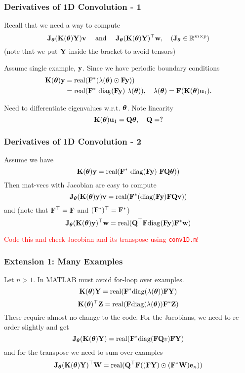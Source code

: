 \documentclass[12pt,fleqn,handout]{beamer}
\begin{document}
\begin{frame}\frametitle{Derivatives of 1D Convolution - 1}
	Recall that we need a way to compute
	$$
		{\bf J}_{\boldsymbol \theta} ({\bf K}({\boldsymbol \theta}){\bf Y}) {\bf v} \quad \text{ and } \quad {\bf J}_{\boldsymbol \theta} ({\bf K}({\boldsymbol \theta}){\bf Y})^\top {\bf w}, \quad ({\bf J}_{\boldsymbol \theta} \in\mathbb{R}^{m \times p})
	$$
	(note that we put ${\bf Y}$ inside the bracket to avoid tensors)

	\bigskip
	\pause
	
	Assume single example, ${\bf y}$. Since we have periodic boundary conditions
	\begin{equation*}
		\begin{split}
	   {\bf K}({\boldsymbol \theta}){\bf y} & =  {\rm real}({\bf F}^*( \lambda({\boldsymbol \theta}) \odot {\bf F} {\bf y})) \\
	                     & = {\rm real}( {\bf F}^* \ {\rm diag}({\bf F} {\bf y}) \ \lambda({\boldsymbol \theta})), \quad 		\lambda({\boldsymbol \theta}) = {\bf F}({\bf K}({\boldsymbol \theta}){\bf u}_1).
		\end{split}
	\end{equation*}
	\pause
	
	Need to differentiate eigenvalues w.r.t. ${\boldsymbol \theta}$. Note linearity
	$$
		{\bf K}({\boldsymbol \theta}) {\bf u}_1 = {\bf Q} {\boldsymbol \theta}, \quad {\bf Q} = ?
	$$
	
\end{frame}

\begin{frame} \frametitle{Derivatives of 1D Convolution - 2}
	Assume we have
	$$
		{\bf K}({\boldsymbol \theta}) {\bf y}  = {\rm real}( {\bf F}^* \ {\rm diag}({\bf F} {\bf y}) \ {\bf F} {\bf Q} {\boldsymbol \theta}))
	$$
	Then mat-vecs with Jacobian are easy to compute
	$$
		{\bf J}_{\boldsymbol \theta} ( {\bf K}({\boldsymbol \theta}) {\bf y}) {\bf v} = {\rm real}( {\bf F}^* ({\rm diag}({\bf F} {\bf y})  {\bf F} {\bf Q} {\bf v}))
	$$
	\pause
	and (note that ${\bf F}^\top = {\bf F}$ and $({\bf F}^*)^\top = {\bf F}^*$)
	$$
		{\bf J}_{\boldsymbol \theta} ({\bf K}({\boldsymbol \theta}) {\bf y})^\top {\bf w} = {\rm real}({\bf Q}^\top {\bf F}  {\rm diag}({\bf F} {\bf y}){\bf F}^* {\bf w})
	$$
	
	\bigskip
	\pause
	
	\begin{center}
		\textcolor{red}{Code this and check Jacobian and its transpose using \texttt{conv1D.m}!}
	\end{center}
	
\end{frame}

\begin{frame}
	\frametitle{Extension 1: Many Examples}
	
	Let $n>1$. In MATLAB must avoid for-loop over examples. 
	$$
		{\bf K}({\boldsymbol \theta}){\bf Y} =  {\rm real}({\bf F}^* {\rm diag}(\lambda({\boldsymbol \theta})) {\bf F} {\bf Y})
	$$
	$$
		 {\bf K}({\boldsymbol \theta})^\top{\bf Z} =  {\rm real}({\bf F} {\rm diag}(\lambda({\boldsymbol \theta})) {\bf F}^* {\bf Z})
	$$
	These require almost no change to the code. For the Jacobians, we need to re-order slightly and get
	$$
		{\bf J}_{\boldsymbol \theta} ({\bf K}({\boldsymbol \theta}){\bf Y}) = {\rm real}({\bf F}^* {\rm diag}({\bf F} {\bf Q} v) {\bf F} {\bf Y})
	$$
	and for the transpose we need to sum over examples
	$$
		{\bf J}_{\boldsymbol \theta}({\bf K}({\boldsymbol \theta}){\bf Y})^\top{\bf W} = {\rm real}({\bf Q}^\top {\bf F}  (({\bf F}{\bf Y}) \odot ({\bf F}^* {\bf W}) {\bf e}_n))
	$$
	
\end{frame}
\end{document}
